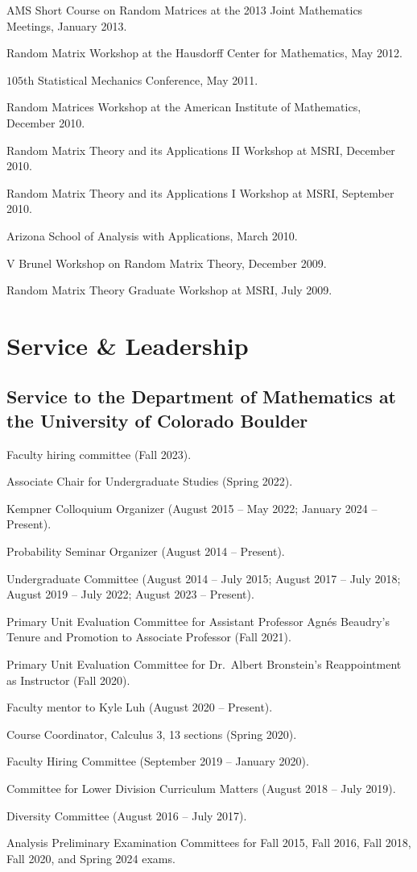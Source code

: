 \documentclass[letterpaper]{article}
\renewenvironment{itemize}{
  \begin{list}{}{
    \setlength{\leftmargin}{1em}
  }
}{
  \end{list}
}
\begin{document}
\begin{itemize}
	\item AMS Short Course on Random Matrices at the 2013 Joint Mathematics Meetings, January 2013.
	\item Random Matrix Workshop at the Hausdorff Center for Mathematics, May 2012.
	\item $105$th Statistical Mechanics Conference, May 2011.  
	\item Random Matrices Workshop at the American Institute of Mathematics, December 2010.
	\item Random Matrix Theory and its Applications II Workshop at MSRI, December 2010.
	\item Random Matrix Theory and its Applications I Workshop at MSRI, September 2010.
	\item Arizona School of Analysis with Applications, March 2010.
	\item V Brunel Workshop on Random Matrix Theory, December 2009.
	\item Random Matrix Theory Graduate Workshop at MSRI, July 2009.
\end{itemize}


\section*{Service \& Leadership}
\subsection*{Service to the Department of Mathematics at the University of Colorado Boulder} 
\begin{itemize}
	\item Faculty hiring committee (Fall 2023). 
	\item Associate Chair for Undergraduate Studies (Spring 2022). 
	\item Kempner Colloquium Organizer (August 2015 -- May 2022; January 2024 -- Present).   
	\item Probability Seminar Organizer (August 2014 -- Present).
	\item Undergraduate Committee (August 2014 -- July 2015; August 2017 -- July 2018; August 2019 -- July 2022; August 2023 -- Present).
	\item Primary Unit Evaluation Committee for Assistant Professor Agn\'{e}s Beaudry's Tenure and Promotion to Associate Professor (Fall 2021).
	\item Primary Unit Evaluation Committee for Dr.\ Albert Bronstein's Reappointment as Instructor (Fall 2020). 
	\item Faculty mentor to Kyle Luh (August 2020 -- Present). 
	\item Course Coordinator, Calculus 3, 13 sections (Spring 2020).  
	\item Faculty Hiring Committee (September 2019 -- January 2020).
	\item Committee for Lower Division Curriculum Matters (August 2018 -- July 2019).  
	\item Diversity Committee (August 2016 -- July 2017).  
	\item Analysis Preliminary Examination Committees for Fall 2015, Fall 2016, Fall 2018, Fall 2020, and Spring 2024 exams.  
\end{itemize}
\end{document}
